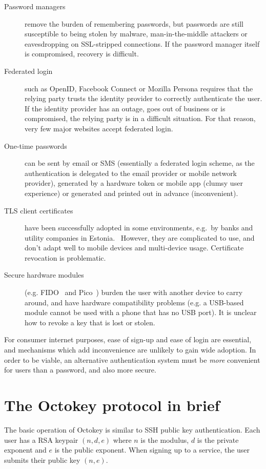 \documentclass{acm_proc_article-sp}
\begin{document}
\begin{description}
\item[Password managers] remove the burden of remembering passwords, but passwords are still
susceptible to being stolen by malware, man-in-the-middle attackers or eavesdropping on SSL-stripped
connections. If the password manager itself is compromised, recovery is difficult.
\item[Federated login] such as OpenID, Facebook Connect or Mozilla Persona requires that the relying
party trusts the identity provider to correctly authenticate the user. If the identity provider has
an outage, goes out of business or is compromised, the relying party is in a difficult situation.
For that reason, very few major websites accept federated login.
\item[One-time passwords] can be sent by email or SMS (essentially a federated login scheme, as the
authentication is delegated to the email provider or mobile network provider), generated by a
hardware token or mobile app (clumsy user experience) or generated and printed out in advance
(inconvenient).
\item[TLS client certificates] have been successfully adopted in some environments, e.g.\ by banks
and utility companies in Estonia.~\cite{Parsovs14} However, they are complicated to use, and don't
adapt well to mobile devices and multi-device usage. Certificate revocation is problematic.
\item[Secure hardware modules] (e.g. FIDO~\cite{FIDOOverview} and Pico~\cite{Stajano11}) burden the
user with another device to carry around, and have hardware compatibility problems (e.g. a USB-based
module cannot be used with a phone that has no USB port). It is unclear how to revoke a key that is
lost or stolen.
\end{description}

For consumer internet purposes, ease of sign-up and ease of login are essential, and mechanisms
which add inconvenience are unlikely to gain wide adoption. In order to be viable, an alternative
authentication system must be \emph{more} convenient for users than a password, and also more
secure.

\section{The Octokey protocol in brief}

The basic operation of Octokey is similar to SSH public key authentication. Each user has a RSA
keypair $(n, d, e)$ where $n$ is the modulus, $d$ is the private exponent and $e$ is the public
exponent. When signing up to a service, the user submits their public key $(n, e)$.
\end{document}
